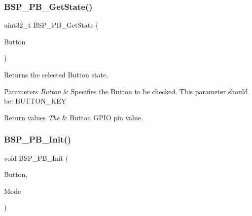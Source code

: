 \subsubsection{\texorpdfstring{B\+S\+P\+\_\+\+P\+B\+\_\+\+Get\+State()}{BSP\_PB\_GetState()}}
{\footnotesize\ttfamily uint32\+\_\+t B\+S\+P\+\_\+\+P\+B\+\_\+\+Get\+State (\begin{DoxyParamCaption}\item[{Button\+\_\+\+Type\+Def}]{Button }\end{DoxyParamCaption})}



Returns the selected Button state. 


\begin{DoxyParams}{Parameters}
{\em Button} & Specifies the Button to be checked. This parameter should be\+: B\+U\+T\+T\+O\+N\+\_\+\+K\+EY ~\newline
\\
\hline
\end{DoxyParams}

\begin{DoxyRetVals}{Return values}
{\em The} & Button G\+P\+IO pin value. \\
\hline
\end{DoxyRetVals}
\mbox{\label{group___s_t_m32_f4___d_i_s_c_o_v_e_r_y___l_o_w___l_e_v_e_l___b_u_t_t_o_n___functions_gaeece1cd3a2156a50bfa81638a27a1143}} 
\subsubsection{\texorpdfstring{B\+S\+P\+\_\+\+P\+B\+\_\+\+Init()}{BSP\_PB\_Init()}}
{\footnotesize\ttfamily void B\+S\+P\+\_\+\+P\+B\+\_\+\+Init (\begin{DoxyParamCaption}\item[{Button\+\_\+\+Type\+Def}]{Button,  }\item[{Button\+Mode\+\_\+\+Type\+Def}]{Mode }\end{DoxyParamCaption})}



